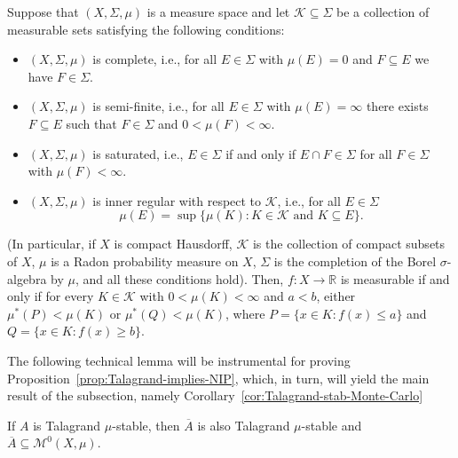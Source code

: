 \begin{fact}\label{fact:meas-fns-charn}
    Suppose that $(X,\Sigma,\mu)$ is a measure space and let $\mathcal{K}\subseteq\Sigma$ be a collection of measurable sets satisfying the following conditions:
    \begin{itemize}
        \item $(X,\Sigma,\mu)$ is complete, i.e., for all $E\in\Sigma$ with $\mu(E)=0$ and $F\subseteq E$ we have $F\in\Sigma$.
        \item $(X,\Sigma,\mu)$ is semi-finite, i.e., for all $E\in\Sigma$ with $\mu(E)=\infty$ there exists $F\subseteq E$ such that $F\in\Sigma$ and $0<\mu(F)<\infty$.
        \item $(X,\Sigma,\mu)$ is saturated, i.e., $E\in\Sigma$ if and only if $E\cap F\in\Sigma$ for all $F\in\Sigma$ with $\mu(F)<\infty$.
        \item $(X,\Sigma,\mu)$ is inner regular with respect to $\mathcal{K}$, i.e., for all $E\in\Sigma$
        \[
	\mu(E)=\sup\{\mu(K):K\in\mathcal{K} \text{ and } K\subseteq E\}.
        \]
    \end{itemize}
    (In particular, if $X$ is compact Hausdorff, $\mathcal{K}$ is the collection of compact subsets of $X$, $\mu$ is a Radon probability measure on $X$, $\Sigma$ is the completion of the Borel $\sigma$-algebra by $\mu$, and all these conditions hold).
    Then, $f\colon X\to\mathbb{R}$ is measurable if and only if for every $K\in\mathcal{K}$ with $0<\mu(K)<\infty$ and $a<b$, either $\mu^*(P)<\mu(K)$ or $\mu^*(Q)<\mu(K)$, where $P=\{x\in K:f(x)\leq a\}$ and $Q=\{x\in K:f(x)\geq b\}$.
\end{fact}

The following technical lemma will be instrumental for proving Proposition~\ref{prop:Talagrand-implies-NIP}, which, in turn, will yield the main result of the subsection, namely Corollary~\ref{cor:Talagrand-stab-Monte-Carlo}

\begin{lemma}\label{lem:talagrand-stab-relcpct}
    If $A$ is Talagrand $\mu$-stable, then $\overline{A}$ is also Talagrand $\mu$-stable and $\overline{A}\subseteq\mathscr{M}^0(X,\mu)$.
\end{lemma}

